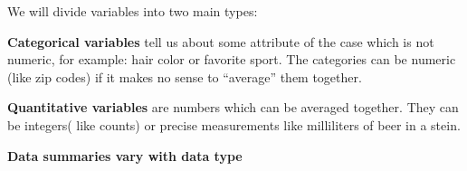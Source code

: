 We will divide variables into two main types:
\begin{list}{}{}
\item [\bf Categorical variables] tell us about some attribute of the
  case which is not numeric, for example: hair color or favorite
  sport.  The categories can be numeric (like zip codes) if it makes
  no sense to ``average'' them together.


\item [\bf Quantitative variables] are numbers which can be averaged
  together. They can be integers( like counts) or precise measurements like
  milliliters of beer in a stein.\vspace{1.5in} 
\end{list}


\begin{center}
{\bf {\large  Data summaries vary with data type}}
\end{center}

